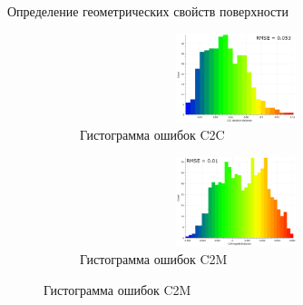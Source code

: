 \documentclass[aspectratio=169,xcolor=table]{beamer}
\begin{document}
\begin{frame}[t]{Определение геометрических свойств поверхности}
\begin{figure}[H]
        \begin{subfigure}[t]{0.49\textwidth}
            \centering\includegraphics[height=2.6cm,width=1\textwidth,keepaspectratio]{pcd_hist.png}
            \caption*{Гистограмма ошибок C2C}
        \end{subfigure}
        \begin{subfigure}[t]{0.49\textwidth}
            \centering\includegraphics[height=2.6cm,width=1\textwidth,keepaspectratio]{mesh_hist.png}
            \caption*{Гистограмма ошибок C2M}
        \end{subfigure}
    \end{figure}
\end{frame}
\end{document}
